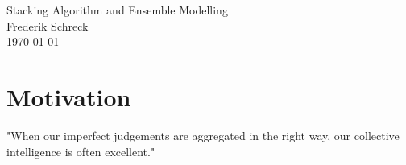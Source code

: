 \documentclass[12pt]{article}
\begin{document}
\begin{center}
{\LARGE Stacking Algorithm and Ensemble Modelling}\\
\vspace{0.5cm}
{\large Frederik Schreck}\\
\vspace{0.5cm}
{\large\today}
\end{center}
\vspace{1cm}


\begin{abstract}
Stacking and Ensemble models currently belong to the most powerful machine learning tools. In depth, this paper introduces and discusses the most important concepts of Stacking and Ensembling. In order to assess their predictive performance in the context of credit risk assessment, a empirical evaluation study is realized on behalf of the German Credit Dataset. Results show that Ensembling models, including a Random Forest and a Gradient Boosting model, outperform standard machine learning models on a broad set of evaluation metrics. Different versions of Stacked Generalization models were able to establish better predictions than their level 0 generalizers. Thereby, more sophisticated Stacking algorithms could establish even better results. The restriction of the subset of input predictions for the Stacked Generalization models was ineffective with regards to performance issues. The results strongly reinforce the value of Stacking and Ensembling strategies for prediction in credit risk assessment problems.
\end{abstract}

\section{Motivation}\label{Intro}
"When our imperfect judgements are aggregated in the right way, our collective intelligence is often excellent." \citep[Foreword p.XIV]{surowiecki2005wisdom}\\
\end{document}
